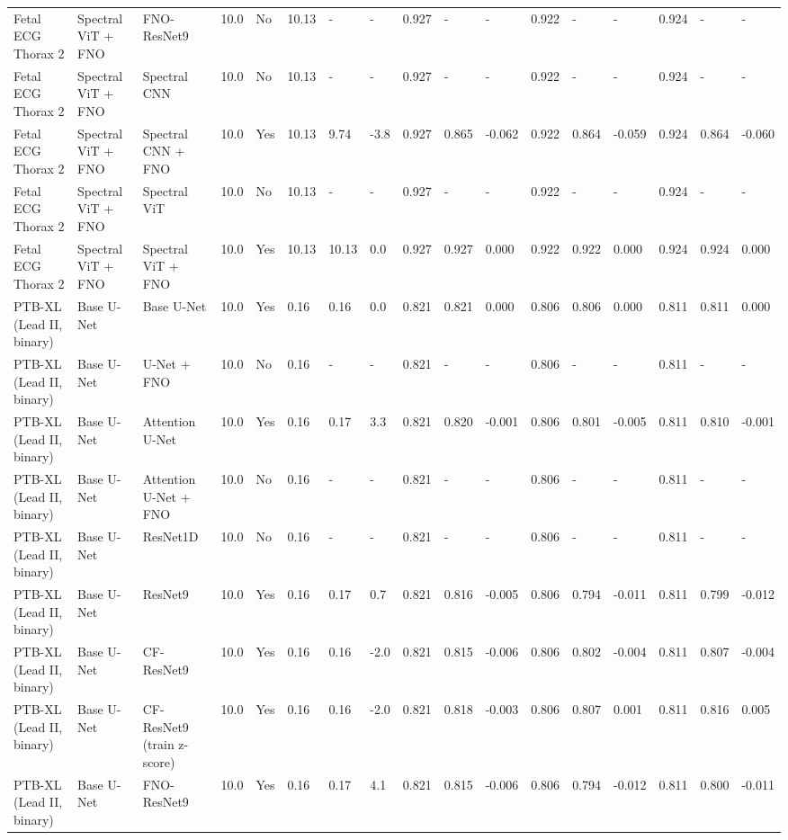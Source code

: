 \begin{longtable}{lllllllllllllllll}
Fetal ECG Thorax 2 & Spectral ViT + FNO & FNO-ResNet9 & 10.0 & No & 10.13 & - & - & 0.927 & - & - & 0.922 & - & - & 0.924 & - & - \\
Fetal ECG Thorax 2 & Spectral ViT + FNO & Spectral CNN & 10.0 & No & 10.13 & - & - & 0.927 & - & - & 0.922 & - & - & 0.924 & - & - \\
Fetal ECG Thorax 2 & Spectral ViT + FNO & Spectral CNN + FNO & 10.0 & Yes & 10.13 & 9.74 & -3.8 & 0.927 & 0.865 & -0.062 & 0.922 & 0.864 & -0.059 & 0.924 & 0.864 & -0.060 \\
Fetal ECG Thorax 2 & Spectral ViT + FNO & Spectral ViT & 10.0 & No & 10.13 & - & - & 0.927 & - & - & 0.922 & - & - & 0.924 & - & - \\
Fetal ECG Thorax 2 & Spectral ViT + FNO & Spectral ViT + FNO & 10.0 & Yes & 10.13 & 10.13 & 0.0 & 0.927 & 0.927 & 0.000 & 0.922 & 0.922 & 0.000 & 0.924 & 0.924 & 0.000 \\
PTB-XL (Lead II, binary) & Base U-Net & Base U-Net & 10.0 & Yes & 0.16 & 0.16 & 0.0 & 0.821 & 0.821 & 0.000 & 0.806 & 0.806 & 0.000 & 0.811 & 0.811 & 0.000 \\
PTB-XL (Lead II, binary) & Base U-Net & U-Net + FNO & 10.0 & No & 0.16 & - & - & 0.821 & - & - & 0.806 & - & - & 0.811 & - & - \\
PTB-XL (Lead II, binary) & Base U-Net & Attention U-Net & 10.0 & Yes & 0.16 & 0.17 & 3.3 & 0.821 & 0.820 & -0.001 & 0.806 & 0.801 & -0.005 & 0.811 & 0.810 & -0.001 \\
PTB-XL (Lead II, binary) & Base U-Net & Attention U-Net + FNO & 10.0 & No & 0.16 & - & - & 0.821 & - & - & 0.806 & - & - & 0.811 & - & - \\
PTB-XL (Lead II, binary) & Base U-Net & ResNet1D & 10.0 & No & 0.16 & - & - & 0.821 & - & - & 0.806 & - & - & 0.811 & - & - \\
PTB-XL (Lead II, binary) & Base U-Net & ResNet9 & 10.0 & Yes & 0.16 & 0.17 & 0.7 & 0.821 & 0.816 & -0.005 & 0.806 & 0.794 & -0.011 & 0.811 & 0.799 & -0.012 \\
PTB-XL (Lead II, binary) & Base U-Net & CF-ResNet9 & 10.0 & Yes & 0.16 & 0.16 & -2.0 & 0.821 & 0.815 & -0.006 & 0.806 & 0.802 & -0.004 & 0.811 & 0.807 & -0.004 \\
PTB-XL (Lead II, binary) & Base U-Net & CF-ResNet9 (train z-score) & 10.0 & Yes & 0.16 & 0.16 & -2.0 & 0.821 & 0.818 & -0.003 & 0.806 & 0.807 & 0.001 & 0.811 & 0.816 & 0.005 \\
PTB-XL (Lead II, binary) & Base U-Net & FNO-ResNet9 & 10.0 & Yes & 0.16 & 0.17 & 4.1 & 0.821 & 0.815 & -0.006 & 0.806 & 0.794 & -0.012 & 0.811 & 0.800 & -0.011 \\

\end{longtable}
